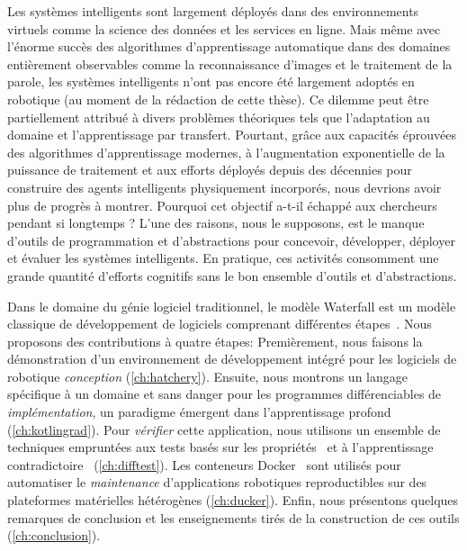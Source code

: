 Les systèmes intelligents sont largement déployés dans des environnements virtuels comme la science des données et les services en ligne. Mais même avec l'énorme succès des algorithmes d'apprentissage automatique dans des domaines entièrement observables comme la reconnaissance d'images et le traitement de la parole, les systèmes intelligents n'ont pas encore été largement adoptés en robotique (au moment de la rédaction de cette thèse). Ce dilemme peut être partiellement attribué à divers problèmes théoriques tels que l'adaptation au domaine et l'apprentissage par transfert. Pourtant, grâce aux capacités éprouvées des algorithmes d'apprentissage modernes, à l'augmentation exponentielle de la puissance de traitement et aux efforts déployés depuis des décennies pour construire des agents intelligents physiquement incorporés, nous devrions avoir plus de progrès à montrer. Pourquoi cet objectif a-t-il échappé aux chercheurs pendant si longtemps ? L'une des raisons, nous le supposons, est le manque d'outils de programmation et d'abstractions pour concevoir, développer, déployer et évaluer les systèmes intelligents. En pratique, ces activités consomment une grande quantité d'efforts cognitifs sans le bon ensemble d'outils et d'abstractions.

Dans le domaine du génie logiciel traditionnel, le modèle Waterfall est un modèle classique de développement de logiciels comprenant différentes étapes~\citep{royce1987managing}. Nous proposons des contributions à quatre étapes: Premièrement, nous faisons la démonstration d'un environnement de développement intégré pour les logiciels de robotique \textit{conception} (\autoref{ch:hatchery}). Ensuite, nous montrons un langage spécifique à un domaine et sans danger pour les programmes différenciables de \textit{implémentation}, un paradigme émergent dans l'apprentissage profond (\autoref{ch:kotlingrad}). Pour \textit{vérifier} cette application, nous utilisons un ensemble de techniques empruntées aux tests basés sur les propriétés~\citep{fink1997property} et à l'apprentissage contradictoire~\citep{lowd2005adversarial} (\autoref{ch:difftest}). Les conteneurs Docker~\citep{merkel2014docker} sont utilisés pour automatiser le \textit{maintenance} d'applications robotiques reproductibles sur des plateformes matérielles hétérogènes (\autoref{ch:ducker}). Enfin, nous présentons quelques remarques de conclusion et les enseignements tirés de la construction de ces outils (\autoref{ch:conclusion}).


